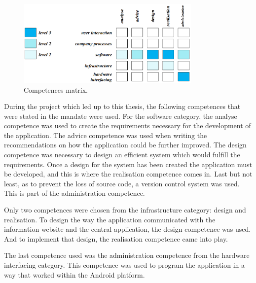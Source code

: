 
\begin{figure}[ht]
    \centering
    \includegraphics[width=0.8\textwidth]{plaatjes/competenties}
    \caption{Competences matrix.}
    \label{fig:top-level}
\end{figure}%

During the project which led up to this thesis, the following competences that were stated in the mandate were used. For the software category, the analyse competence was used to create the requirements necessary for the development of the application. The advice competence was used when writing the recommendations on how the application could be further improved. The design competence was necessary to design an efficient system which would fulfill the requirements. Once a design for the system has been created the application must be developed, and this is where the realisation competence comes in. Last but not least, as to prevent the loss of source code, a version control system was used. This is part of the administration competence.

Only two competences were chosen from the infrastructure category: design and realisation. To design the way the application communicated with the information website and the central application, the design competence was used. And to implement that design, the realisation competence came into play.

The last competence used was the administration competence from the hardware interfacing category. This competence was used to program the application in a way that worked within the Android platform.
